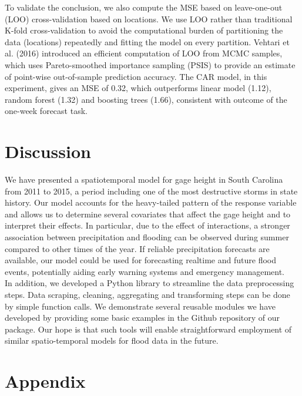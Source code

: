 \documentclass{svjour3}
\renewcommand\hl[1]{#1}
\begin{document}
\hl{To validate the conclusion, we also compute the MSE based on leave-one-out (LOO) cross-validation based on locations.
We use LOO rather than traditional K-fold cross-validation to avoid the computational burden of partitioning the data (locations) repeatedly and fitting the model on every partition.
Vehtari et al. (2016) introduced an efficient computation of LOO from MCMC samples,
which uses Pareto-smoothed importance sampling (PSIS) to provide an estimate
of point-wise out-of-sample prediction accuracy.
The CAR model, in this experiment, gives an MSE of 0.32, which outperforms linear model (1.12), random forest (1.32) and boosting
trees (1.66), consistent with outcome of the one-week forecast task.}











\section{Discussion}\label{sec:discussion}

We have presented a spatiotemporal model for gage height in South Carolina from 2011 to 2015, a period including one of the most destructive storms in state history.
Our model accounts for the heavy-tailed pattern of the response variable and allows us to determine several covariates that affect the gage height and to interpret their effects.
In particular, due to the effect of interactions, a stronger association between precipitation and flooding can be observed during summer compared to other times of the year.
If reliable precipitation forecasts are available, our model could be used for forecasting realtime and future flood events, potentially aiding early warning systems and emergency management.\\

In addition, we developed a Python library to streamline the data preprocessing steps.
Data scraping,  cleaning, aggregating and transforming steps can be done by simple function calls.
We demonstrate several reusable modules we have developed  by providing some basic examples in the Github repository of our package.
Our hope is that such tools will enable straightforward employment of similar spatio-temporal models for flood data in the future.


\appendix
\section{Appendix}\label{sec:appendix}
\nonumber
\end{document}
